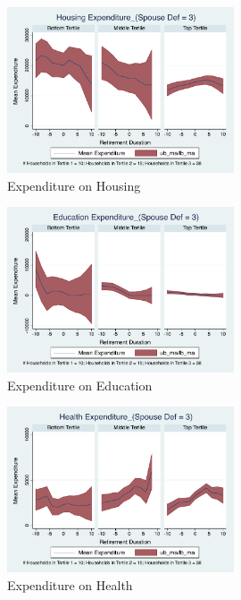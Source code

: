 \documentclass[11pt,onecolumn]{article}
\begin{document}
\clearpage

\begin{figure}[h]
	\caption{Expenditure on Housing}
	\centering
	\includegraphics[width=0.6\textwidth]{../ConsumptionPostRetirement_by_SpouseDef_Cats/Smoothed/3/spouse_def_total_housing_real.pdf}
\end{figure}


\begin{figure}[h]
	\caption{Expenditure on Education}
	\centering
	\includegraphics[width=0.6\textwidth]{../ConsumptionPostRetirement_by_SpouseDef_Cats/Smoothed/3/spouse_def_total_education_real.pdf}
\end{figure}
\clearpage

\begin{figure}[h]
	\caption{Expenditure on Health}
	\centering
	\includegraphics[width=0.6\textwidth]{../ConsumptionPostRetirement_by_SpouseDef_Cats/Smoothed/3/spouse_def_total_healthexpense_real.pdf}
\end{figure}
\end{document}

